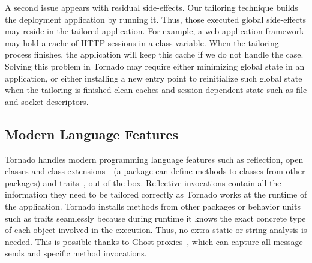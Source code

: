A second issue appears with residual side-effects. Our tailoring technique builds the deployment application by running it. Thus, those executed global side-effects may reside in the tailored application. For example, a web application framework may hold a cache of HTTP sessions in a class variable. When the tailoring process finishes, the application will keep this cache if we do not handle the case. Solving this problem in Tornado may require either minimizing global state in an application, or either installing a new entry point to reinitialize such global state when the tailoring is finished \eg clean caches and session dependent state such as file and socket descriptors.

\subsection{Modern Language Features}

Tornado handles modern programming language features such as reflection, open classes and class extensions~\cite{Berg03a}~(\ie a package can define methods to classes from other packages) and traits~\cite{Scha03a}, out of the box. Reflective invocations contain all the information they need to be tailored correctly as Tornado works at the runtime of the application. Tornado installs methods from other packages or behavior units such as traits seamlessly because during runtime it knows the exact concrete type of each object involved in the execution. Thus, no extra static or string analysis is needed. This is possible thanks to Ghost proxies~\cite{Mart11a}, which can capture all message sends and specific method invocations.


%

